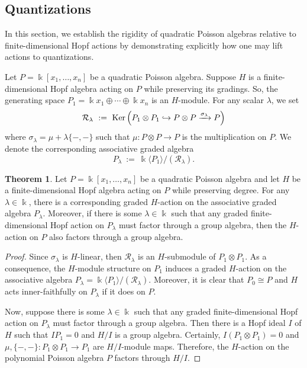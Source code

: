 \documentclass[reqno]{amsart}
\numberwithin{equation}{section}
\theoremstyle{definition}
\newtheorem{theorem}{Theorem}[section]
\newcommand\kk{\Bbbk}
\newcommand\cR{\mathcal R}
\begin{document}
\subsection{Quantizations}
In this section, we establish the rigidity of quadratic Poisson algebras relative to finite-dimensional Hopf actions by demonstrating explicitly how one may lift actions to quantizations.

Let $P=\kk[x_1,\ldots,x_n]$ be a quadratic Poisson algebra. Suppose $H$ is a finite-dimensional Hopf algebra acting on $P$ while preserving its gradings. So, the generating space $P_1=\kk x_1\oplus \cdots \oplus \kk x_n$ is an $H$-module. For any scalar $\lambda$, we set 
\begin{align}\label{KerT}
\cR_\lambda~:=~{\rm Ker}\left(P_1\otimes P_1\hookrightarrow P\otimes P\xrightarrow{\sigma_\lambda} P\right) 
\end{align}
where $\sigma_\lambda=\mu+\lambda\{-,-\}$ such that $\mu: P\otimes P\to P$ is the multiplication on $P$. We denote the corresponding  associative graded algebra
\[P_\lambda~:=~\kk\langle P_1\rangle/(\cR_\lambda).\]

\begin{theorem}\label{thm.quant}
Let $P=\kk[x_1,\ldots,x_n]$ be a quadratic Poisson algebra and let $H$ be a finite-dimensional Hopf algebra acting on $P$ while preserving degree. For any $\lambda\in \kk$, there is a corresponding graded $H$-action on the associative graded algebra $P_\lambda$. Moreover, if there is some $\lambda\in \kk$ such that any graded finite-dimensional Hopf action on $P_\lambda$ must factor through a group algebra, then the $H$-action on $P$ also factors through a group algebra.  
\end{theorem}
\begin{proof}
Since $\sigma_\lambda$ is $H$-linear, then $\cR_\lambda$ is an $H$-submodule of $P_1\otimes P_1$. As a consequence, the $H$-module structure on $P_1$ induces a graded $H$-action on the associative algebra $P_\lambda=\kk\langle P_1\rangle/(\cR_\lambda)$. Moreover, it is clear that $P_0\cong P$ and $H$ acts inner-faithfully on $P_\lambda$ if it does on $P$. 

Now, suppose there is some $\lambda\in \kk$ such that any graded finite-dimensional Hopf action on $P_\lambda$ must factor through a group algebra. Then there is a Hopf ideal $I$ of $H$ such that $IP_1=0$ and $H/I$ is a group algebra. Certainly, $I(P_1\otimes P_1)=0$ and $\mu,\{-,-\}: P_1\otimes P_1\to P_1$ are $H/I$-module maps. Therefore, the $H$-action on the polynomial Poisson algebra $P$ factors through $H/I$.
\end{proof}
\end{document}
